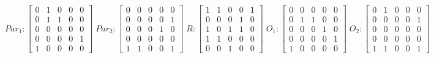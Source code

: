      $$
        Par_{1} : \begin{bmatrix}
            0 & 1 & 0 & 0 & 0 \\
            0 & 1 & 1 & 0 & 0 \\
            0 & 0 & 0 & 0 & 0 \\
			0 & 0 & 0 & 0 & 1 \\
            1 & 0 & 0 & 0 & 0 
        \end{bmatrix}
        \;
        Par_{2} : \begin{bmatrix}
            0 & 0 & 0 & 0 & 0 \\
            0 & 0 & 0 & 0 & 1 \\
            0 & 0 & 0 & 1 & 0 \\
            0 & 0 & 0 & 0 & 0 \\
            1 & 1 & 0 & 0 & 1
        \end{bmatrix}
        \;
        R : \begin{bmatrix}
            1 & 1 & 0 & 0 & 1 \\
            0 & 0 & 0 & 1 & 0 \\
            1 & 0 & 1 & 1 & 0 \\
            1 & 1 & 0 & 0 & 0 \\
            0 & 0 & 1 & 0 & 0
        \end{bmatrix}
        \;
        O_{1} : \begin{bmatrix}
            0 & 0 & 0 & 0 & 0 \\
            0 & 1 & 1 & 0 & 0 \\
            0 & 0 & 0 & 1 & 0 \\
            0 & 0 & 0 & 0 & 1 \\
            1 & 0 & 0 & 0 & 0
        \end{bmatrix}
        \;
        O_{2} : \begin{bmatrix}
            0 & 1 & 0 & 0 & 0 \\
            0 & 0 & 0 & 0 & 1 \\
            0 & 0 & 0 & 0 & 0 \\
            0 & 0 & 0 & 0 & 0 \\
            1 & 1 & 0 & 0 & 1
        \end{bmatrix}
    $$ 
